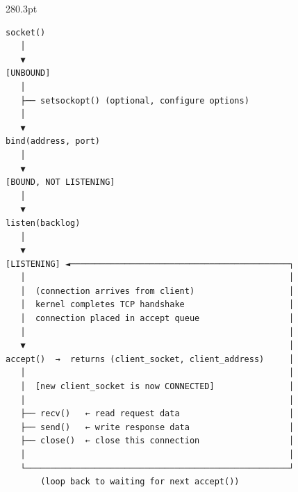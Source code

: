 \begin{diagrambox}[short]{280.3pt}
\begin{Verbatim}[fontsize=\fontsize{9.0}{8.55}\selectfont]
socket()
   │
   ▼
[UNBOUND]
   │
   ├── setsockopt() (optional, configure options)
   │
   ▼
bind(address, port)
   │
   ▼
[BOUND, NOT LISTENING]
   │
   ▼
listen(backlog)
   │
   ▼
[LISTENING] ◄────────────────────────────────────────────┐
   │                                                     │
   │  (connection arrives from client)                   │
   │  kernel completes TCP handshake                     │
   │  connection placed in accept queue                  │
   │                                                     │
   ▼                                                     │
accept()  →  returns (client_socket, client_address)     │
   │                                                     │
   │  [new client_socket is now CONNECTED]               │
   │                                                     │
   ├── recv()   ← read request data                      │
   ├── send()   ← write response data                    │
   ├── close()  ← close this connection                  │
   │                                                     │
   └─────────────────────────────────────────────────────┘
       (loop back to waiting for next accept())
\end{Verbatim}
\end{diagrambox}

